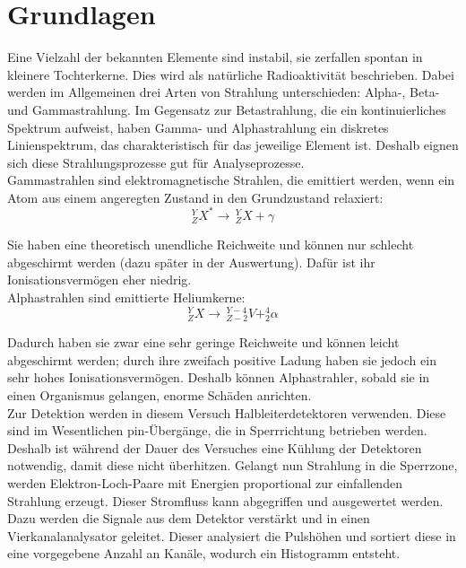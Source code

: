 
\chapter{Grundlagen}

Eine Vielzahl der bekannten Elemente sind instabil, sie zerfallen spontan in kleinere Tochterkerne. Dies wird als natürliche 
Radioaktivität beschrieben. Dabei werden im Allgemeinen drei Arten von Strahlung unterschieden: Alpha-, Beta- und Gammastrahlung. 
Im Gegensatz zur Betastrahlung, die ein kontinuierliches Spektrum aufweist, haben Gamma- und Alphastrahlung ein diskretes Linienspektrum, 
das charakteristisch für das jeweilige Element ist. Deshalb eignen sich diese Strahlungsprozesse gut für Analyseprozesse. \\

Gammastrahlen sind elektromagnetische Strahlen, die emittiert werden, wenn ein Atom aus einem angeregten Zustand in den Grundzustand 
relaxiert: \\
\begin{equation*}
    ^Y_ZX^* \to \, ^Y_ZX + \gamma
\end{equation*}

Sie haben eine theoretisch unendliche Reichweite und können nur schlecht abgeschirmt werden (dazu später in der Auswertung). Dafür ist 
ihr Ionisationsvermögen eher niedrig. \\

Alphastrahlen sind emittierte Heliumkerne: \\

\begin{equation*}
    ^Y_ZX \to \, ^{Y-4}_{Z-2}V + ^4_2\alpha
\end{equation*}

Dadurch haben sie zwar eine sehr geringe Reichweite und können leicht abgeschirmt werden; durch ihre zweifach positive Ladung haben sie 
jedoch ein sehr hohes Ionisationsvermögen. Deshalb können Alphastrahler, sobald sie in einen Organismus gelangen, enorme Schäden anrichten. \\

Zur Detektion werden in diesem Versuch Halbleiterdetektoren verwenden. Diese sind im Wesentlichen pin-Übergänge, die in Sperrrichtung 
betrieben werden. Deshalb ist während der Dauer des Versuches eine Kühlung der Detektoren notwendig, damit diese nicht überhitzen. 
Gelangt nun Strahlung in die Sperrzone, werden Elektron-Loch-Paare mit Energien proportional zur einfallenden Strahlung erzeugt. Dieser 
Stromfluss kann abgegriffen und ausgewertet werden. Dazu werden die Signale aus dem Detektor verstärkt und in einen Vierkanalanalysator 
geleitet. Dieser analysiert die Pulshöhen und sortiert diese in eine vorgegebene Anzahl an Kanäle, wodurch ein Histogramm entsteht.\\

